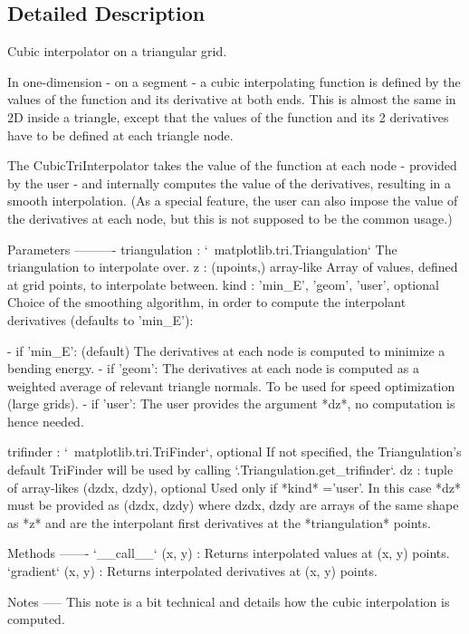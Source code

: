 \subsection{Detailed Description}
\begin{DoxyVerb}Cubic interpolator on a triangular grid.

In one-dimension - on a segment - a cubic interpolating function is
defined by the values of the function and its derivative at both ends.
This is almost the same in 2D inside a triangle, except that the values
of the function and its 2 derivatives have to be defined at each triangle
node.

The CubicTriInterpolator takes the value of the function at each node -
provided by the user - and internally computes the value of the
derivatives, resulting in a smooth interpolation.
(As a special feature, the user can also impose the value of the
derivatives at each node, but this is not supposed to be the common
usage.)

Parameters
----------
triangulation : `~matplotlib.tri.Triangulation`
    The triangulation to interpolate over.
z : (npoints,) array-like
    Array of values, defined at grid points, to interpolate between.
kind : {'min_E', 'geom', 'user'}, optional
    Choice of the smoothing algorithm, in order to compute
    the interpolant derivatives (defaults to 'min_E'):

    - if 'min_E': (default) The derivatives at each node is computed
      to minimize a bending energy.
    - if 'geom': The derivatives at each node is computed as a
      weighted average of relevant triangle normals. To be used for
      speed optimization (large grids).
    - if 'user': The user provides the argument *dz*, no computation
      is hence needed.

trifinder : `~matplotlib.tri.TriFinder`, optional
    If not specified, the Triangulation's default TriFinder will
    be used by calling `.Triangulation.get_trifinder`.
dz : tuple of array-likes (dzdx, dzdy), optional
    Used only if  *kind* ='user'. In this case *dz* must be provided as
    (dzdx, dzdy) where dzdx, dzdy are arrays of the same shape as *z* and
    are the interpolant first derivatives at the *triangulation* points.

Methods
-------
`__call__` (x, y) : Returns interpolated values at (x, y) points.
`gradient` (x, y) : Returns interpolated derivatives at (x, y) points.

Notes
-----
This note is a bit technical and details how the cubic interpolation is
computed.


\end{DoxyVerb}
